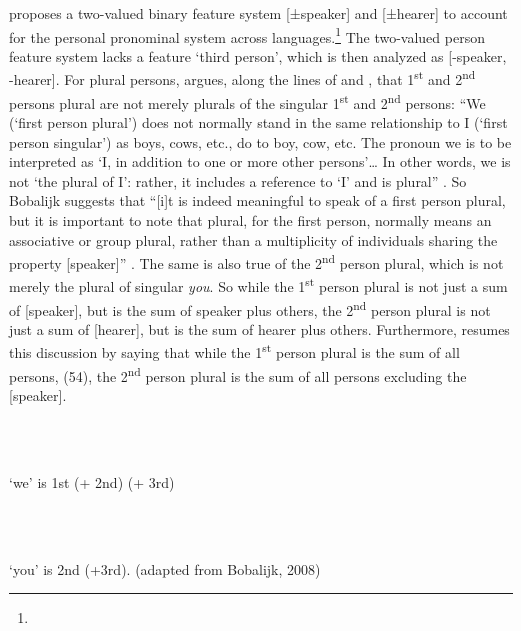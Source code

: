 \documentclass[output=paper]{langsci/langscibook}
\begin{document}
\citet{Bobaljik2008} proposes a two-valued binary feature system [±speaker] and [±hearer] to account for the personal pronominal system across languages.\footnote{} The two-valued person feature system lacks a feature ‘third person’, which is then analyzed as [-speaker, -hearer]. For plural persons, \citet{Bobalijk2008} argues, along the lines of \citet{Lyons1968} and \citet{Benveniste1966}, that 1\textsuperscript{st} and 2\textsuperscript{nd} persons plural are not merely plurals of the singular 1\textsuperscript{st} and 2\textsuperscript{nd} persons: “We (‘first person plural’) does not normally stand in the same relationship to I (‘first person singular’) as boys, cows, etc., do to boy, cow, etc. The pronoun we is to be interpreted as ‘I, in addition to one or more other persons’… In other words, we is not ‘the plural of I’: rather, it includes a reference to ‘I’ and is plural” \citet[277]{Lyons1968}. So Bobalijk suggests that “[i]t is indeed meaningful to speak of a first person plural, but it is important to note that plural, for the first person, normally means an associative or group plural, rather than a multiplicity of individuals sharing the property [speaker]” \citep[209]{Bobaljik2008}. The same is also true of the 2\textsuperscript{nd} person plural, which is not merely the plural of singular \textit{you}. So while the 1\textsuperscript{st} person plural is not just a sum of [speaker], but is the sum of speaker plus others, the 2\textsuperscript{nd} person plural is not just a sum of [hearer], but is the sum of hearer plus others. Furthermore, \citet{Bobaljik2008} resumes this discussion by saying that while the 1\textsuperscript{st} person plural is the sum of all persons, (54), the 2\textsuperscript{nd} person plural is the sum of all persons excluding the [speaker].

\ea%
    \label{ex:key:54}
    \gll\\
        \\
    \glt
    \z

          ‘we’ is 1st (+ 2nd) (+ 3rd) 

\ea%
    \label{ex:key:55}
    \gll\\
        \\
    \glt
    \z

          ‘you’ is 2nd (+3rd). (adapted from Bobalijk, 2008) 
\end{document}
